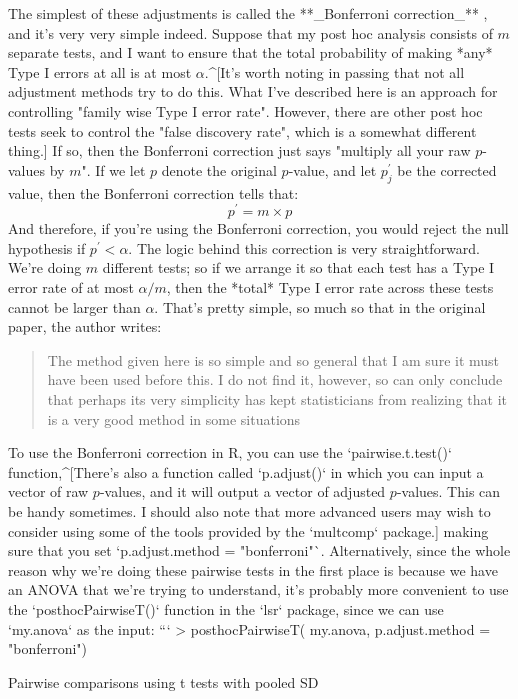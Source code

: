 The simplest of these adjustments is called the **_Bonferroni correction_** \cite{Dunn1961}, and it's very very simple indeed. Suppose that my post hoc analysis consists of $m$ separate tests, and I want to ensure that the total probability of making *any* Type I errors at all is at most $\alpha$.^[It's worth noting in passing that not all adjustment methods try to do this. What I've described here is an approach for controlling "family wise Type I error rate". However, there are other post hoc tests seek to control the "false discovery rate", which is a somewhat different thing.] If so, then the Bonferroni correction just says "multiply all your raw $p$-values by $m$". If we let $p$ denote the original $p$-value, and let $p^\prime_j$ be the corrected value, then the Bonferroni correction tells that:
$$
p^\prime = m \times p
$$
And therefore, if you're using the Bonferroni correction, you would reject the null hypothesis if $p^\prime < \alpha$. The logic behind this correction is very straightforward. We're doing $m$ different tests; so if we arrange it so that each test has a Type I error rate of at most $\alpha / m$, then the *total* Type I error rate across these tests cannot be larger than $\alpha$. That's pretty simple, so much so that in the original paper, the author writes:
\begin{quote}
The method given here is so simple and so general that I am sure it must have been used before this. I do not find it, however, so can only conclude that perhaps its very simplicity has kept statisticians from realizing that it is a very good method in some situations \cite[pp 52-53]{Dunn1961}
\end{quote}
To use the Bonferroni correction in R, you can use the `pairwise.t.test()` function,^[There's also a function called `p.adjust()` in which you can input a vector of raw $p$-values, and it will output a vector of adjusted $p$-values. This can be handy sometimes. I should also note that more advanced users may wish to consider using some of the tools provided by the `multcomp` package.] making sure that you set `p.adjust.method = "bonferroni"`. Alternatively, since the whole reason why we're doing these pairwise tests in the first place is because we have an ANOVA that we're trying to understand, it's probably more convenient to use the `posthocPairwiseT()` function in the `lsr` package, since we can use `my.anova` as the input:
```
> posthocPairwiseT( my.anova, p.adjust.method = "bonferroni")

	Pairwise comparisons using t tests with pooled SD 

